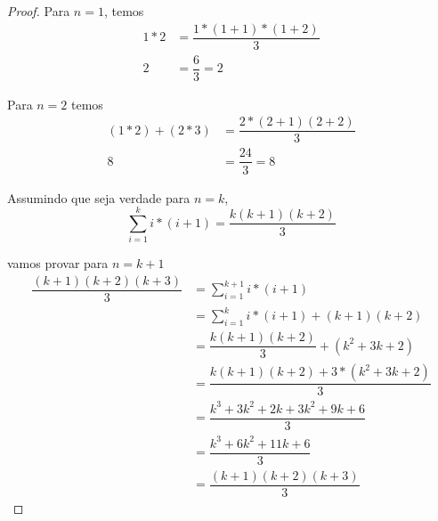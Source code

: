 \documentclass{article}
\begin{document}
\begin{proof}
	Para $n = 1$, temos
	\begin{equation}
	\begin{split}
		1 * 2 & = \dfrac{1*(1 + 1)*(1 + 2)}{3} \\
		2 & = \dfrac{6}{3} = 2
	\end{split}
	\end{equation}

	Para $n = 2$ temos
	\begin{equation}
	\begin{split}
		(1 * 2)+(2 * 3) & = \dfrac{2*(2 + 1)(2 + 2)}{3}\\
		8 & = \dfrac{24}{3} = 8
	\end{split}
	\end{equation}

	Assumindo que seja verdade para $n = k$, 
	\begin{equation}
		\sum\limits_{i = 1}^{k}i * (i+1) = \dfrac{k(k + 1)(k + 2)}{3}
	\end{equation}


	vamos provar para $n = k +1$
	\begin{equation}
		\begin{split}
		\dfrac{(k + 1)(k + 2)(k + 3)}{3} & = \sum\limits_{i = 1}^{k+1}i * (i+1)\\
		&  = \sum\limits_{i = 1}^{k}i * (i+1) + (k + 1)(k + 2) \\
		&  = \dfrac{k(k + 1)(k + 2)}{3} + (k^2 + 3k + 2) \\
		&  = \dfrac{k(k + 1)(k + 2) + 3*(k^2 + 3k + 2) }{3}  \\
		&  = \dfrac{k^3 + 3k^2 + 2k + 3k^2 + 9k + 6 }{3}  \\
		&  = \dfrac{k^3 + 6k^2 + 11k + 6}{3}  \\
		&  = \dfrac{(k + 1)(k + 2)(k + 3)}{3} 
		\end{split}
	\end{equation}
\end{proof}
\end{document}
